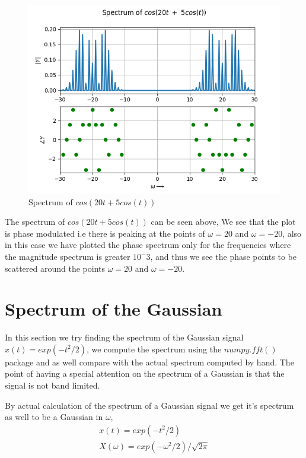 \documentclass[11pt, a4paper]{article}
\begin{document}
\begin{figure}[H]
\centering
\includegraphics[scale=0.62]{Figure_5.png}
\caption{Spectrum of $cos(20t + 5cos(t))$}
\label{fig:freqMod}
\end{figure}
The spectrum of $cos(20t + 5cos(t))$ can be seen above, \newline
We see that the plot is phase modulated i.e there is peaking at the points of $\omega=20$ and $\omega=-20$, also in this case we have plotted the phase spectrum only for the frequencies where the magnitude spectrum is greater $10^-3$, and thus we see the phase points to be scattered around the points $\omega=20$ and $\omega=-20$.

\section{Spectrum of the Gaussian}
In this section we try finding the spectrum of the Gaussian signal $x(t)=exp(-t^2/2)$, we compute the spectrum using the $numpy.fft()$ package and as well compare with the actual spectrum computed by hand. The point of having a special attention on the spectrum of a Gaussian is that the signal is not band limited. 

By actual calculation of the spectrum of a Gaussian signal we get it's spectrum as well to be a Gaussian in $\omega$,
\begin{gather}
    x(t) = exp(-t^2/2)\\
    X(\omega) = exp(-{\omega}^2/2)/\sqrt{2\pi}
\end{gather}
\end{document}
